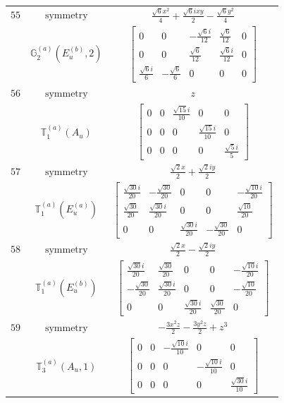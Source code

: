\documentclass[fleqn,8pt,landscape]{jsarticle}
\begin{document}
\begin{longtable}{ccc}
$ 55 $ & $ \text{symmetry} $ & $ \frac{\sqrt{6} x^{2}}{4} + \frac{\sqrt{6} i x y}{2} - \frac{\sqrt{6} y^{2}}{4} $ \\
$  $ & $ \mathbb{G}_{2}^{(a)}(E_{u}^{(b)},2) $ & $ \begin{bmatrix} 0 & 0 & - \frac{\sqrt{6} i}{12} & \frac{\sqrt{6}}{12} & 0 \\ 0 & 0 & \frac{\sqrt{6}}{12} & \frac{\sqrt{6} i}{12} & 0 \\ \frac{\sqrt{6} i}{6} & - \frac{\sqrt{6}}{6} & 0 & 0 & 0 \end{bmatrix} $ \\ \hline
$ 56 $ & $ \text{symmetry} $ & $ z $ \\
$  $ & $ \mathbb{T}_{1}^{(a)}(A_{u}) $ & $ \begin{bmatrix} 0 & 0 & \frac{\sqrt{15} i}{10} & 0 & 0 \\ 0 & 0 & 0 & \frac{\sqrt{15} i}{10} & 0 \\ 0 & 0 & 0 & 0 & \frac{\sqrt{5} i}{5} \end{bmatrix} $ \\ \hline
$ 57 $ & $ \text{symmetry} $ & $ \frac{\sqrt{2} x}{2} + \frac{\sqrt{2} i y}{2} $ \\
$  $ & $ \mathbb{T}_{1}^{(a)}(E_{u}^{(a)}) $ & $ \begin{bmatrix} \frac{\sqrt{30} i}{20} & - \frac{\sqrt{30}}{20} & 0 & 0 & - \frac{\sqrt{10} i}{20} \\ \frac{\sqrt{30}}{20} & \frac{\sqrt{30} i}{20} & 0 & 0 & \frac{\sqrt{10}}{20} \\ 0 & 0 & \frac{\sqrt{30} i}{20} & - \frac{\sqrt{30}}{20} & 0 \end{bmatrix} $ \\ \hline
$ 58 $ & $ \text{symmetry} $ & $ \frac{\sqrt{2} x}{2} - \frac{\sqrt{2} i y}{2} $ \\
$  $ & $ \mathbb{T}_{1}^{(a)}(E_{u}^{(b)}) $ & $ \begin{bmatrix} \frac{\sqrt{30} i}{20} & \frac{\sqrt{30}}{20} & 0 & 0 & - \frac{\sqrt{10} i}{20} \\ - \frac{\sqrt{30}}{20} & \frac{\sqrt{30} i}{20} & 0 & 0 & - \frac{\sqrt{10}}{20} \\ 0 & 0 & \frac{\sqrt{30} i}{20} & \frac{\sqrt{30}}{20} & 0 \end{bmatrix} $ \\ \hline
$ 59 $ & $ \text{symmetry} $ & $ - \frac{3 x^{2} z}{2} - \frac{3 y^{2} z}{2} + z^{3} $ \\
$  $ & $ \mathbb{T}_{3}^{(a)}(A_{u},1) $ & $ \begin{bmatrix} 0 & 0 & - \frac{\sqrt{10} i}{10} & 0 & 0 \\ 0 & 0 & 0 & - \frac{\sqrt{10} i}{10} & 0 \\ 0 & 0 & 0 & 0 & \frac{\sqrt{30} i}{10} \end{bmatrix} $ \\ \hline

\end{longtable}
\end{document}
